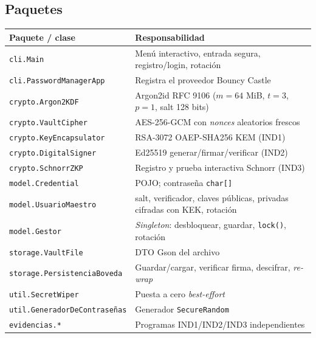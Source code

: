 \documentclass[11pt,a4paper]{article}
\begin{document}
\subsection{Paquetes}
\begin{longtable}{@{}p{5.4cm}p{8.8cm}@{}}
\toprule
Paquete / clase & Responsabilidad \\
\midrule
\texttt{cli.Main} & Menú interactivo, entrada segura, registro/login, rotación \\
\texttt{cli.PasswordManagerApp} & Registra el proveedor Bouncy Castle \\
\texttt{crypto.Argon2KDF} & Argon2id RFC 9106 ($m{=}64$ MiB, $t{=}3$, $p{=}1$, salt 128 bits) \\
\texttt{crypto.VaultCipher} & AES-256-GCM con \emph{nonces} aleatorios frescos \\
\texttt{crypto.KeyEncapsulator} & RSA-3072 OAEP-SHA256 KEM (IND1) \\
\texttt{crypto.DigitalSigner} & Ed25519 generar/firmar/verificar (IND2) \\
\texttt{crypto.SchnorrZKP} & Registro y prueba interactiva Schnorr (IND3) \\
\texttt{model.Credential} & POJO; contraseña \texttt{char[]} \\
\texttt{model.UsuarioMaestro} & salt, verificador, claves públicas, privadas cifradas con KEK, rotación \\
\texttt{model.Gestor} & \emph{Singleton}: desbloquear, guardar, \texttt{lock()}, rotación \\
\texttt{storage.VaultFile} & DTO Gson del archivo \\
\texttt{storage.PersistenciaBoveda} & Guardar/cargar, verificar firma, descifrar, \emph{re-wrap} \\
\texttt{util.SecretWiper} & Puesta a cero \emph{best-effort} \\
\texttt{util.GeneradorDeContrase\~nas} & Generador \texttt{SecureRandom} \\
\texttt{evidencias.*} & Programas IND1/IND2/IND3 independientes \\
\bottomrule
\end{longtable}
\end{document}
